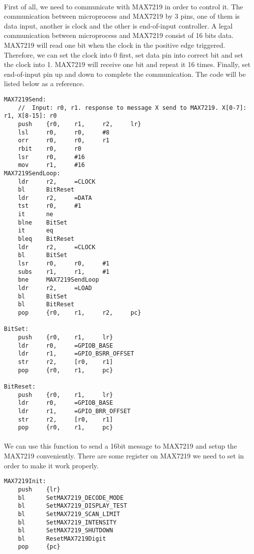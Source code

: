 \paragraph{}
First of all, we need to communicate with MAX7219 in order to control it. The communication between microprocess and MAX7219 by 3 pins, one of them is data input, another is clock and the other is end-of-input controller. A legal communication between microprocess and MAX7219 consist of 16 bits data. MAX7219 will read one bit when the clock in the positive edge triggered. Therefore, we can set the clock into 0 first, set data pin into correct bit and set the clock into 1. MAX7219 will receive one bit and repeat it 16 times. Finally, set end-of-input pin up and down to complete the communication. The code will be listed below as a reference.
\begin{lstlisting}
MAX7219Send:
    //  Input: r0, r1. response to message X send to MAX7219. X[0-7]: r1, X[8-15]: r0
    push    {r0,    r1,     r2,     lr}
    lsl     r0,     r0,     #8
    orr     r0,     r0,     r1
    rbit    r0,     r0
    lsr     r0,     #16
    mov     r1,     #16
MAX7219SendLoop:
    ldr     r2,     =CLOCK
    bl      BitReset
    ldr     r2,     =DATA
    tst     r0,     #1
    it      ne
    blne    BitSet
    it      eq
    bleq    BitReset
    ldr     r2,     =CLOCK
    bl      BitSet
    lsr     r0,     r0,     #1
    subs    r1,     r1,     #1
    bne     MAX7219SendLoop
    ldr     r2,     =LOAD
    bl      BitSet
    bl      BitReset
    pop     {r0,    r1,     r2,     pc}

BitSet:
    push    {r0,    r1,     lr}
    ldr     r0,     =GPIOB_BASE
    ldr     r1,     =GPIO_BSRR_OFFSET
    str     r2,     [r0,    r1]
    pop     {r0,    r1,     pc}

BitReset:
    push    {r0,    r1,     lr}
    ldr     r0,     =GPIOB_BASE
    ldr     r1,     =GPIO_BRR_OFFSET
    str     r2,     [r0,    r1]
    pop     {r0,    r1,     pc}
\end{lstlisting}
\paragraph{}
We can use this function to send a 16bit message to MAX7219 and setup the MAX7219 conveniently. There are some register on MAX7219 we need to set in order to make it work properly.
\begin{lstlisting}
MAX7219Init:
    push    {lr}
    bl      SetMAX7219_DECODE_MODE
    bl      SetMAX7219_DISPLAY_TEST
    bl      SetMAX7219_SCAN_LIMIT
    bl      SetMAX7219_INTENSITY
    bl      SetMAX7219_SHUTDOWN
    bl      ResetMAX7219Digit
    pop     {pc}
\end{lstlisting}
